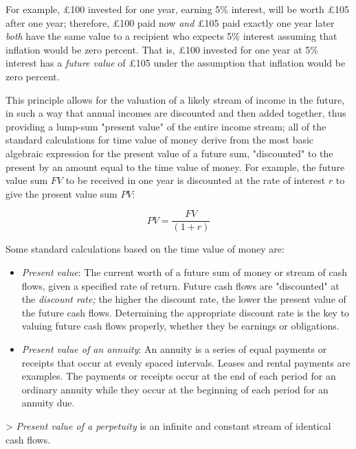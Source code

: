 For example, £100 invested for one year, earning 5\% interest, will be worth £105 after
one year; therefore, £100 paid now \textit{and} £105 paid exactly one year later
\textit{both} have the same value to a recipient who expects 5\% interest assuming that
inflation would be zero percent. That is, £100 invested for one year at 5\% interest has a
\textit{future value} of £105 under the assumption that inflation would be zero percent.



This principle allows for the valuation of a likely stream of income in the future, in
such a way that annual incomes are discounted and then added together, thus providing a
lump-sum "present value" of the entire income stream; all of the standard calculations for
time value of money derive from the most basic algebraic expression for the present value
of a future sum, "discounted" to the present by an amount equal to the time value of
money. For example, the future value sum $FV$ to be received in one year is discounted at
the rate of interest $r$ to give the present value sum $PV$:



$$PV = \frac{FV}{(1+r)}$$



Some standard calculations based on the time value of money are:



\begin{itemize}
    \item \textit{Present value}: The current worth of a future sum of money or stream of cash flows, given a specified rate of return. Future cash flows are "discounted" at the \textit{discount rate;} the higher the discount rate, the lower the present value of the future cash flows. Determining the appropriate discount rate is the key to valuing future cash flows properly, whether they be earnings or obligations.
    \item \textit{Present value of an annuity}: An annuity is a series of equal payments or receipts that occur at evenly spaced intervals. Leases and rental payments are examples. The payments or receipts occur at the end of each period for an ordinary annuity while they occur at the beginning of each period for an annuity due.
\end{itemize}

> \textit{Present value of a perpetuity} is an infinite and constant stream of identical cash flows.



